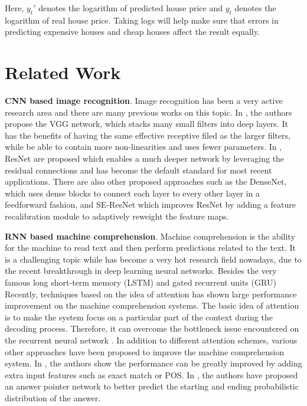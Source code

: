 \documentclass{article} %
\begin{document}
Here, $y_t'$ denotes the logarithm of predicted house price 
and $y_t$ denotes the logarithm of real house price.
Taking logs will help make sure that errors in predicting expensive houses 
and cheap houses affect the result equally.

\section{Related Work}

\textbf{CNN based image recognition}.
Image recognition has been a very active research area
and there are many previous works on this topic.
In \cite{simonyan2014very},
the authors propose the VGG network, which stacks many small filters into deep layers.
It has the benefits of having the same effective receptive filed as the larger filters,
while be able to contain more non-linearities and uses fewer parameters.
In \cite{he2016deep}, ResNet are proposed which enables a much deeper network 
by leveraging the residual connections and has become the default standard for most recent applications.
There are also other proposed approaches such as the DenseNet\cite{huang2017densely},
which uses dense blocks to connect each layer to every other layer in a feedforward fashion,
and SE-ResNet\cite{hu2017squeeze} which improves ResNet by adding a feature recalibration module to adaptively reweight the feature maps.

\textbf{RNN based machine comprehension}.
Machine comprehension is the ability for the machine to read text and then perform predictions related to the text.
It is a challenging topic while has become a very hot research field nowadays, 
due to the recent breakthrough in deep learning neural networks.
Besides the very famous long short-term memory (LSTM) \cite{hochreiter1997long} 
and gated recurrent units (GRU) \cite{cho2014learning}
Recently, techniques based on the idea of attention has shown large performance improvement on the machine comprehension systems.
The basic idea of attention is to make the system focus on a particular part of the context during the decoding process. 
Therefore, it can overcome the bottleneck issue encountered on the recurrent neural network \cite{cho2014learning}.
In addition to different attention schemes, various other approaches have been proposed to improve the machine comprehension system. In \cite{chen2017reading}, the authors show the performance can be greatly improved by adding extra input features such as exact match or POS. In \cite{wang2016machine}, the authors have proposed an answer pointer network to better predict the starting and ending probabilistic distribution of the answer.
\end{document}
